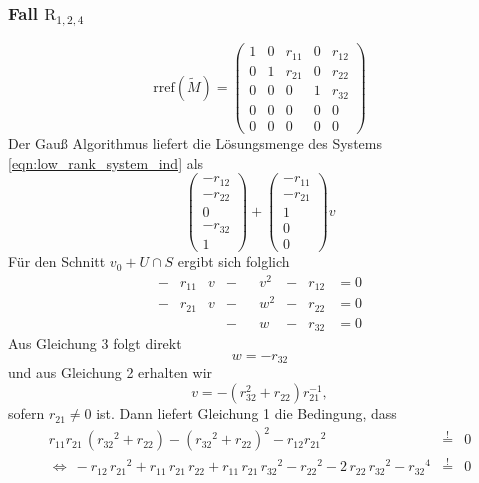 \documentclass[a4paper,oneside, 11pt, openany%
]{article}
\theoremstyle{custom}
\theoremstyle{custom}
\begin{document}
\subsubsection*{Fall $\text{R}_{1,2,4}$}
\begin{equation*}\label{eqn:rref_r124}
	\text{rref}(\tilde{M}) =
	\left( \begin{array}{ccccc}
		1&0&r_{11}&0&r_{12}\\
		0&1&r_{21}&0&r_{22}\\
		0&0&0&1&r_{32}\\
		0&0&0&0&0\\
		0&0&0&0&0
	\end{array}\right)
\end{equation*}
Der Gauß Algorithmus liefert die Lösungsmenge des Systems \eqref{eqn:low_rank_system_ind} als
\begin{equation*}
	\begin{pmatrix}
		-r_{12}\\
		-r_{22}\\
		0\\
		-r_{32}\\
		1
	\end{pmatrix} +
	\begin{pmatrix}
		-r_{11}\\
		-r_{21}\\
		1\\
		0\\
		0
	\end{pmatrix}v
\end{equation*}
Für den Schnitt $v_0 + U \cap S $ ergibt sich folglich
\begin{equation*}
	\begin{alignedat}{8}
		-&r_{11}&v&-&&v^2&-&r_{12}&=0\\
		-&r_{21}&v&-&&w^2&-&r_{22}&=0\\
		&&&-&&w&-&r_{32}&=0
	\end{alignedat}
\end{equation*}
Aus Gleichung 3 folgt direkt
\begin{equation}
	w = -r_{32}
\end{equation}
und aus Gleichung 2 erhalten wir
\begin{equation}
	v = -\left( r_{32}^2+r_{22}\right) r_{21}^{-1},
\end{equation}
sofern $r_{21} \neq 0$ ist.
Dann liefert Gleichung 1 die Bedingung, dass
\begin{equation}
	\begin{alignedat}{2}
		r_{11}r_{21}\,\left({r_{32}}^2+r_{22}\right)-{\left({r_{32}}^2+r_{22}\right)}^2-r_{12}{r_{21}}^2&\overset{!}{=}&0\\
		\Leftrightarrow \ -r_{12}\,{r_{21}}^2+r_{11}\,r_{21}\,r_{22}+r_{11}\,r_{21}\,{r_{32}}^2-{r_{22}}^2-2\,r_{22}\,{r_{32}}^2-{r_{32}}^4&\overset{!}{=}&0
	\end{alignedat}
\end{equation}
\end{document}
